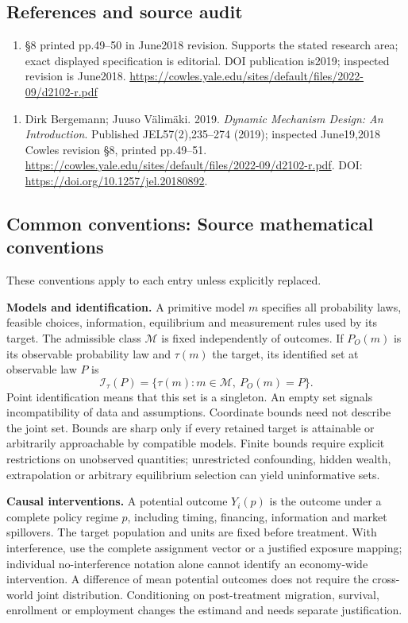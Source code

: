 \documentclass[11pt,a4paper]{article}
\begin{document}
\subsection*{References and source audit}
\begin{enumerate}
\item §8 printed pp.49–50 in June2018 revision. Supports the stated research area; exact displayed specification is editorial. DOI publication is2019; inspected revision is June2018. \url{https://cowles.yale.edu/sites/default/files/2022-09/d2102-r.pdf}
\end{enumerate}
\begin{enumerate}\raggedright
\item\hypertarget{definitions:source:30007572:1}{} Dirk Bergemann; Juuso Välimäki. 2019. \emph{Dynamic Mechanism Design: An Introduction}. Published JEL57(2),235–274 (2019); inspected June19,2018 Cowles revision §8, printed pp.49–51.
\url{https://cowles.yale.edu/sites/default/files/2022-09/d2102-r.pdf}.
DOI: \url{https://doi.org/10.1257/jel.20180892}.
\end{enumerate}

\subsection*{Common conventions: Source mathematical conventions}

These conventions apply to each entry unless explicitly replaced.

\textbf{Models and identification.} A primitive model \(m\) specifies all probability laws, feasible choices, information, equilibrium and measurement rules used by its target. The admissible class \(\mathcal M\) is fixed independently of outcomes. If \(P_O(m)\) is its observable probability law and \(\tau(m)\) the target, its identified set at observable law \(P\) is
\[
 \mathcal I_\tau(P)=\{\tau(m):m\in\mathcal M,\ P_O(m)=P\}.
\]
Point identification means that this set is a singleton. An empty set signals incompatibility of data and assumptions. Coordinate bounds need not describe the joint set. Bounds are sharp only if every retained target is attainable or arbitrarily approachable by compatible models. Finite bounds require explicit restrictions on unobserved quantities; unrestricted confounding, hidden wealth, extrapolation or arbitrary equilibrium selection can yield uninformative sets.

\textbf{Causal interventions.} A potential outcome \(Y_i(p)\) is the outcome under a complete policy regime \(p\), including timing, financing, information and market spillovers. The target population and units are fixed before treatment. With interference, use the complete assignment vector or a justified exposure mapping; individual no-interference notation alone cannot identify an economy-wide intervention. A difference of mean potential outcomes does not require the cross-world joint distribution. Conditioning on post-treatment migration, survival, enrollment or employment changes the estimand and needs separate justification.
\end{document}
